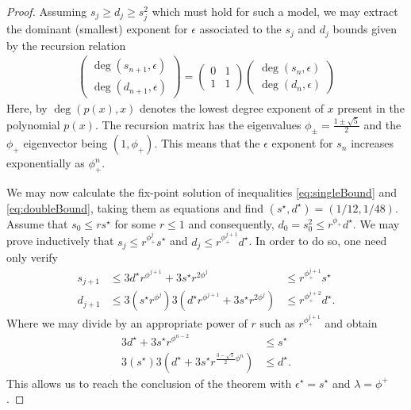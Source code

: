 \documentclass[12pt]{article}
\theoremstyle{plain}
\theoremstyle{plain}
\theoremstyle{plain}
\theoremstyle{plain}
\theoremstyle{result}
\theoremstyle{remark}
\theoremstyle{conjecture}
\theoremstyle{observation}
\theoremstyle{definition}
\theoremstyle{corollary}
\theoremstyle{definition}
\theoremstyle{definition}
\theoremstyle{assumption}
\theoremstyle{definition}
\theoremstyle{problem}
\theoremstyle{fact}
\begin{document}
\begin{proof}
Assuming $s_j \geq d_j \geq s_j^2$ which must hold for such a model, we may extract the dominant (smallest) exponent for $\epsilon$ associated to the  $s_j$ and $d_j$ bounds given by the recursion relation
\begin{align}
\begin{pmatrix} \deg(s_{n+1},\epsilon) \\ \deg(d_{n+1},\epsilon) \end{pmatrix} = 
\begin{pmatrix} 0 & 1 \\ 1 & 1 \end{pmatrix} \begin{pmatrix} \deg(s_{n},\epsilon) \\ \deg(d_{n},\epsilon) \end{pmatrix}
\end{align}
Here, by $\deg(p(x),x)$ denotes the lowest  degree exponent of $x$ present in the polynomial $p(x)$.
The recursion matrix has the eigenvalues $\phi_{\pm} = \frac{1\pm\sqrt{5}}{2}$ and the $\phi_+$ eigenvector being $(1,\phi_+)$.
 This means that the $\epsilon$ exponent for $s_n$ increases exponentially as $\phi_+^n$.
 
We may now calculate the fix-point solution of inequalities \ref{eq:singleBound} and \ref{eq:doubleBound}, taking them as equations and find $(s^\star, d^\star)=(1/12,1/48)$.
Assume that $s_0 \leq r s^\star$  for some $r\leq 1$ and consequently, $d_0 = s_0^2 \leq r^{\phi_+} d^\star$.
We may prove inductively that  $s_j \leq r^{\phi_+^j}s^\star$ and $d_j \leq r^{\phi_+^{j+1}}d^\star$.
In order to do so, one need only verify
\begin{align}
       s_{j+1} &\leq 3 d^\star r^{\phi^{j+1}} + 3 s^\star r^{2\phi^j} &\leq r^{\phi_+^{j+1}} s^\star\\
      d_{j+1} &\leq  3(s^\star r^{\phi^{j}}) 3 ( d^\star r^{\phi^{j+1}} + 3 s^\star r^{2\phi^j} ) &\leq r^{\phi_+^{j+2}} d^\star.
\end{align}
Where we may divide by an appropriate power of $r$ such as $r^{\phi_+^{j+1}}$ and obtain
\begin{align}
 3 d^\star + 3 s^\star r^{\phi^{n-2}} &\leq s^\star\\
 3(s^\star ) 3 ( d^\star + 3 s^\star r^{\frac{3-\sqrt{5}}{2}\phi^n} ) &\leq d^\star.
\end{align}
This allows us to reach the conclusion of the theorem with $\epsilon^\star = s^\star$ and $\lambda = \phi^+$.
\end{proof}
\end{document}
